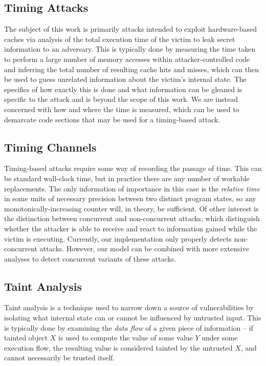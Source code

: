 \documentclass[12pt]{article}
\begin{document}
\begin{multicols*}{2}
  \subsection{Timing Attacks}

  The subject of this work is primarily attacks intended to exploit
  hardware-based caches via analysis of the total execution time of the victim
  to leak secret information to an adversary\cite{Ge2018}. This is typically
  done by measuring the time taken to perform a large number of memory accesses
  within attacker-controlled code and inferring the total number of resulting
  cache hits and misses, which can then be used to guess unrelated information
  about the victim's internal state. The specifics of how exactly this is done
  and what information can be gleaned is specific to the attack and is
  beyond the scope of this work. We are instead concerned with how and where
  the time is measured, which can be used to demarcate code sections that may
  be used for a timing-based attack.

  \subsection{Timing Channels}

  Timing-based attacks require some way of recording the passage of
  time. This can be standard wall-clock time, but in practice there
  are any number of workable replacements. The only information of
  importance in this case is the \textit{relative time} in some units
  of necessary precision between two distinct program states,
  so any monotonically-increasing counter will, in theory, be
  sufficient\cite{Ge2018}. Of other interest is the distinction
  between concurrent and non-concurrent attacks, which distinguish
  whether the attacker is able to receive and react to information
  gained while the victim is executing\cite{lcache}. Currently, our
  implementation only properly detects non-concurrent attacks.
  However, our model can be combined with more extensive analyses to
  detect concurrent variants of these attacks.

  \subsection{Taint Analysis}

  Taint analysis is a technique used to narrow down a source of
  vulnerabilities by isolating what internal state can or cannot be
  influenced by untrusted input. This is typically done by examining
  the \textit{data flow} of a given piece of information -- if tainted
  object $X$ is used to compute the value of some value $Y$ under some
  execution flow, the resulting value is considered tainted by the
  untrusted $X$, and cannot necessarily be trusted itself\cite{taint}.


\end{multicols*}
\end{document}
